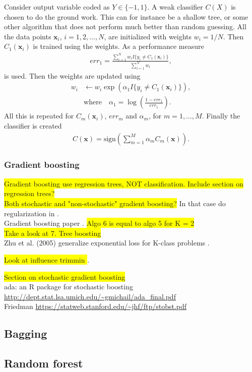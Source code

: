 Consider output variable coded as $Y \in \{-1, 1\}$. A weak classifier $C(X)$ is chosen to do the ground work. This can for instance be a shallow tree, or some other algorithm that does not perform much better than random guessing. All the data points $\mathbf{x}_i$, $i = 1, 2, \ldots, N$, are initialized with weights $w_i = 1/N$. Then $C_1(\mathbf{x}_i)$ is trained using the weights. As a performance measure 
\begin{align}
  err_1 =  \frac{\sum^{N}_{i=1} w_i I\{y_i \neq C_1(\mathbf{x}_i)\}}{\sum^{N}_{i=1} w_i},
\end{align}
is used. Then the weights are updated using 
\begin{align}
  w_i &\leftarrow w_i \exp\left( \alpha_1 I\{y_i \neq C_1(\mathbf{x}_i)\} \right), \\
  &\text{where} \quad \alpha_1 = \log\left(  \frac{1-err_1}{err_1} \right).
\end{align}
All this is repeated for $C_m(\mathbf{x}_i)$, $err_m$ and $\alpha_m$, for $m = 1, \ldots, M$. Finally the classifier is created
\begin{align}
  C( \mathbf{x}) = \text{sign}\left( \sum^{M}_{m=1} \alpha_m C_m(\mathbf{x}) \right).
\end{align}


\subsubsection{Gradient boosting}
\label{subsub:Gradient boosting}
\colorbox{yellow}{Gradient boosting use regression trees, NOT classification. Include section on regression trees?} \\
\colorbox{yellow}{Both stochastic and "non-stochastic" gradient boosting?} In that case do regularization in \cite{modstat}.
\\ Gradient boosting paper \cite{friedman}. \colorbox{yellow}{Algo 6 is equal to algo 5  for K = 2}\\
\colorbox{yellow}{Take a look at 7. Tree boosting \cite[p.~22]{friedman}} \\
Zhu et al. (2005) generalize exponential loss for K-class problems \cite[p.~349]{modstat}.

\colorbox{yellow}{Look at influence trimmin \cite{friedman}}.










\colorbox{yellow}{Section on stochastic gradient boosting}\\
ada: an R package for stochastic boosting \url{http://dept.stat.lsa.umich.edu/~gmichail/ada_final.pdf} \\
Friedman \url{https://statweb.stanford.edu/~jhf/ftp/stobst.pdf} \\
\subsection{Bagging}
\label{sub:Bagging}

\subsection{Random forest}
\label{sub:Random forest}

